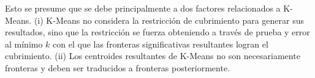 


Esto se presume que se debe principalmente a dos factores relacionados a
K-Means.\todo{:} (i) K-Means no considera la restricción de cubrimiento para generar
sus resultados, sino que la restricción se fuerza obteniendo a través de prueba
y error al mínimo $k$ con el que las fronteras significativas resultantes
logran el cubrimiento. (ii) Los centroides resultantes de K-Means no son
necesariamente fronteras y deben ser traducidos a fronteras posteriormente.







